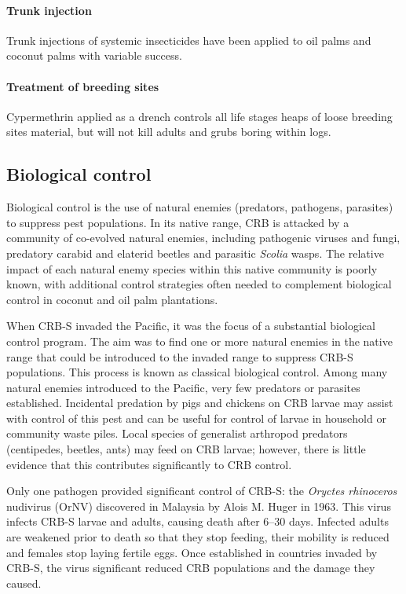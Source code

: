 \documentclass[twocolumn,letterpaper]{scrartcl}
\begin{document}
\paragraph{Trunk injection}
Trunk injections of systemic insecticides have been applied to oil palms and coconut palms with variable success.

\paragraph{Treatment of breeding sites}
Cypermethrin applied as a drench controls all life stages heaps of loose breeding sites material, but will not kill adults and grubs boring within logs.

\subsection{Biological control}

Biological control is the use of natural enemies (predators, pathogens, parasites) to suppress pest populations. In its native range, CRB is attacked by a community of co-evolved natural enemies, including pathogenic viruses and fungi, predatory carabid and elaterid beetles  and  parasitic  \textit{Scolia}  wasps.  The  relative  impact  of  each  natural  enemy  species  within  this  native community is poorly known, with additional control strategies often needed to complement biological control in coconut and oil palm plantations.

When CRB-S invaded the Pacific, it was the focus of a substantial biological control  program.  The  aim was to find one or more natural enemies in the native range that could be introduced to the invaded range to  suppress  CRB-S  populations.  This  process  is  known  as  classical  biological  control. Among many natural enemies introduced to the Pacific, very few predators or parasites established. Incidental predation by pigs and chickens on CRB larvae may assist with control of this pest and can be useful for control of larvae in household or community waste piles. Local species of generalist arthropod predators (centipedes, beetles, ants) may feed on CRB larvae; however, there is 
little evidence that this contributes significantly to CRB control. 

Only one pathogen provided significant control of CRB-S: the \textit{Oryctes rhinoceros} nudivirus (OrNV) discovered in Malaysia by Alois M. Huger in 1963. This virus infects CRB-S larvae and adults, causing death after 6–30 days. Infected adults are weakened prior to death so that they stop feeding, their mobility is reduced and females stop laying fertile eggs. Once established in countries invaded by CRB-S, the virus significant reduced CRB populations and the damage they caused. 
\end{document}
